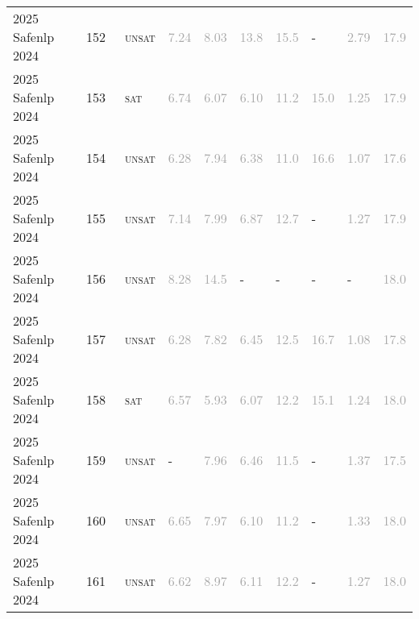 \begin{center}
{\begin{longtable}{@{}llllllllll@{}}
2025 Safenlp 2024 & 152 & ~\textsc{unsat} & \textcolor{darkgray}{7.24} & \textcolor{darkgray}{8.03} & \textcolor{darkgray}{13.8} & \textcolor{darkgray}{15.5} & - & \textcolor{darkgray}{2.79} & \textcolor{darkgray}{17.9} \\
2025 Safenlp 2024 & 153 & ~\textsc{sat} & \textcolor{darkgray}{6.74} & \textcolor{darkgray}{6.07} & \textcolor{darkgray}{6.10} & \textcolor{darkgray}{11.2} & \textcolor{darkgray}{15.0} & \textcolor{darkgray}{1.25} & \textcolor{darkgray}{17.9} \\
2025 Safenlp 2024 & 154 & ~\textsc{unsat} & \textcolor{darkgray}{6.28} & \textcolor{darkgray}{7.94} & \textcolor{darkgray}{6.38} & \textcolor{darkgray}{11.0} & \textcolor{darkgray}{16.6} & \textcolor{darkgray}{1.07} & \textcolor{darkgray}{17.6} \\
2025 Safenlp 2024 & 155 & ~\textsc{unsat} & \textcolor{darkgray}{7.14} & \textcolor{darkgray}{7.99} & \textcolor{darkgray}{6.87} & \textcolor{darkgray}{12.7} & - & \textcolor{darkgray}{1.27} & \textcolor{darkgray}{17.9} \\
2025 Safenlp 2024 & 156 & ~\textsc{unsat} & \textcolor{darkgray}{8.28} & \textcolor{darkgray}{14.5} & - & - & - & - & \textcolor{darkgray}{18.0} \\
2025 Safenlp 2024 & 157 & ~\textsc{unsat} & \textcolor{darkgray}{6.28} & \textcolor{darkgray}{7.82} & \textcolor{darkgray}{6.45} & \textcolor{darkgray}{12.5} & \textcolor{darkgray}{16.7} & \textcolor{darkgray}{1.08} & \textcolor{darkgray}{17.8} \\
2025 Safenlp 2024 & 158 & ~\textsc{sat} & \textcolor{darkgray}{6.57} & \textcolor{darkgray}{5.93} & \textcolor{darkgray}{6.07} & \textcolor{darkgray}{12.2} & \textcolor{darkgray}{15.1} & \textcolor{darkgray}{1.24} & \textcolor{darkgray}{18.0} \\
2025 Safenlp 2024 & 159 & ~\textsc{unsat} & - & \textcolor{darkgray}{7.96} & \textcolor{darkgray}{6.46} & \textcolor{darkgray}{11.5} & - & \textcolor{darkgray}{1.37} & \textcolor{darkgray}{17.5} \\
2025 Safenlp 2024 & 160 & ~\textsc{unsat} & \textcolor{darkgray}{6.65} & \textcolor{darkgray}{7.97} & \textcolor{darkgray}{6.10} & \textcolor{darkgray}{11.2} & - & \textcolor{darkgray}{1.33} & \textcolor{darkgray}{18.0} \\
2025 Safenlp 2024 & 161 & ~\textsc{unsat} & \textcolor{darkgray}{6.62} & \textcolor{darkgray}{8.97} & \textcolor{darkgray}{6.11} & \textcolor{darkgray}{12.2} & - & \textcolor{darkgray}{1.27} & \textcolor{darkgray}{18.0} \\

\end{longtable}}
\end{center}
